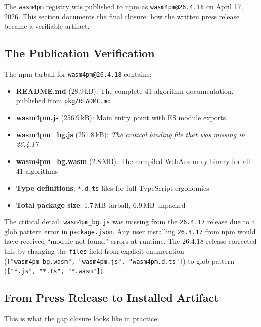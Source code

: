\documentclass[11pt,a4paper]{article}
\newcommand{\code}[1]{\texttt{#1}}
\begin{document}
The \code{wasm4pm} registry was published to npm as \code{wasm4pm@26.4.18} on April 17, 2026.
This section documents the final closure: how the written press release became a verifiable artifact.

\subsection{The Publication Verification}

The npm tarball for \code{wasm4pm@26.4.18} contains:

\begin{itemize}
  \item \textbf{README.md} (28.9\,kB): The complete 41-algorithm documentation, published from \code{pkg/README.md}
  \item \textbf{wasm4pm.js} (256.9\,kB): Main entry point with ES module exports
  \item \textbf{wasm4pm\_bg.js} (251.8\,kB): \textit{The critical binding file that was missing in 26.4.17}
  \item \textbf{wasm4pm\_bg.wasm} (2.8\,MB): The compiled WebAssembly binary for all 41 algorithms
  \item \textbf{Type definitions}: \code{*.d.ts} files for full TypeScript ergonomics
  \item \textbf{Total package size}: 1.7\,MB tarball, 6.9\,MB unpacked
\end{itemize}

The critical detail: \code{wasm4pm\_bg.js} was missing from the \code{26.4.17} release due to a glob pattern error in \code{package.json}. Any user installing \code{26.4.17} from npm would have received ``module not found'' errors at runtime. The 26.4.18 release corrected this by changing the \code{files} field from explicit enumeration (\code{["wasm4pm\_bg.wasm", "wasm4pm.js", "wasm4pm.d.ts"]}) to glob pattern (\code{["*.js", "*.ts", "*.wasm"]}).

\subsection{From Press Release to Installed Artifact}

This is what the gap closure looks like in practice:
\end{document}
